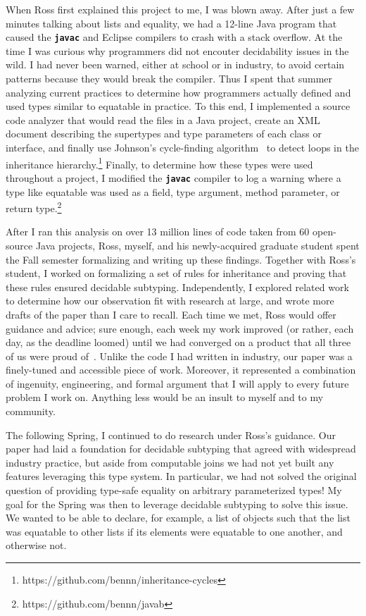 \documentclass{article}
\newcommand{\mono}[1]{\textbf{\texttt{#1}}}
\begin{document}
When Ross first explained this project to me, I was blown away.
After just a few minutes talking about lists and equality, we had a 12-line Java program that caused the \mono{javac} and Eclipse compilers to crash with a stack overflow.
At the time I was curious why programmers did not encouter decidability issues in the wild.
I had never been warned, either at school or in industry, to avoid certain patterns because they would break the compiler.
Thus I spent that summer analyzing current practices to determine how programmers actually defined and used types similar to equatable in practice.
To this end, I implemented a source code analyzer that would read the files in a Java project, create an XML document describing the supertypes and type parameters of each class or interface, and finally use Johnson's cycle-finding algorithm~\cite{johnson} to detect loops in the inheritance hierarchy.\footnote{https://github.com/bennn/inheritance-cycles}
Finally, to determine how these types were used throughout a project, I modified the \mono{javac} compiler to log a warning where a type like equatable was used as a field, type argument, method parameter, or return type.\footnote{https://github.com/bennn/javab}

After I ran this analysis on over 13 million lines of code taken from 60 open-source Java projects, Ross, myself, and his newly-acquired graduate student spent the Fall semester formalizing and writing up these findings.
Together with Ross's student, I worked on formalizing a set of rules for inheritance and proving that these rules ensured decidable subtyping.
Independently, I explored related work to determine how our observation fit with research at large, and wrote more drafts of the paper than I care to recall.
Each time we met, Ross would offer guidance and advice; sure enough, each week my work improved (or rather, each day, as the deadline loomed) until we had converged on a product that all three of us were proud of~\cite{shapes}.
Unlike the code I had written in industry, our paper was a finely-tuned and accessible piece of work.
Moreover, it represented a combination of ingenuity, engineering, and formal argument that I will apply to every future problem I work on.
Anything less would be an insult to myself and to my community.

\newpage

The following Spring, I continued to do research under Ross's guidance.
Our paper had laid a foundation for decidable subtyping that agreed with widespread industry practice, but aside from computable joins we had not yet built any features leveraging this type system.
In particular, we had not solved the original question of providing type-safe equality on arbitrary parameterized types!
My goal for the Spring was then to leverage decidable subtyping to solve this issue.
We wanted to be able to declare, for example, a list of objects such that the list was equatable to other lists if its elements were equatable to one another, and otherwise not.
\end{document}

